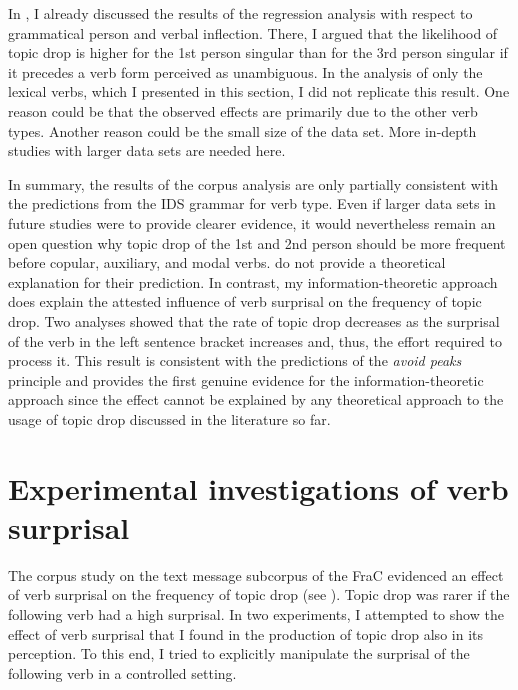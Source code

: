 In , I already discussed the results of the regression analysis with respect to grammatical person and verbal inflection.
There, I argued that the likelihood of topic drop is higher for the 1st person singular than for the 3rd person singular if it precedes a verb form perceived as unambiguous.
In the analysis of only the lexical verbs, which I presented in this section, I did not replicate this result.
One reason could be that the observed effects are primarily due to the other verb types.
Another reason could be the small size of the data set.
More in-depth studies with larger data sets are needed here.

In summary, the results of the corpus analysis are only partially consistent with the predictions from the IDS grammar for verb type.
Even if larger data sets in future studies were to provide clearer evidence, it would nevertheless remain an open question why topic drop of the 1st and 2nd person should be more frequent before copular, auxiliary, and modal verbs.
\citet{zifonun.etal1997} do not provide a theoretical explanation for their prediction.
In contrast, my information-theoretic approach does explain the attested influence of verb surprisal on the frequency of topic drop.
Two analyses showed that the rate of topic drop decreases as the surprisal of the verb in the left sentence bracket increases and, thus, the effort required to process it.
This result is consistent with the predictions of the \textit{avoid peaks} principle and provides the first genuine evidence for the information-theoretic approach since the effect cannot be explained by any theoretical approach to the usage of topic drop discussed in the literature so far.
     

\newpage
\section{Experimental investigations of verb surprisal}\label{sec:exps.surprisal}
\label{exp:surprisal}
The corpus study on the text message subcorpus of the FraC evidenced an effect of verb surprisal on the frequency of topic drop (see ).
Topic drop was rarer if the following verb had a high surprisal.
In two experiments, I attempted to show the effect of verb surprisal that I found in the production of topic drop also in its perception.
To this end, I tried to explicitly manipulate the surprisal of the following verb in a controlled setting.

